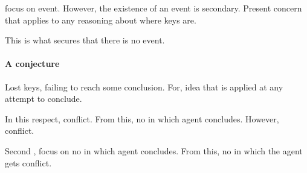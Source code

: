\begin{note}
   focus on event.
  However, the existence of an event is secondary.
  Present concern that applies to any reasoning about where keys are.

  This is what secures that there is no event.
\end{note}

\paragraph*{A conjecture}

\begin{note}
  Lost keys, failing to reach some conclusion.
  For, idea that is applied at any attempt to conclude.

  In this respect, conflict.
  From this, no \pevent{} in which agent concludes.
  However, conflict.

  Second , focus on no  in which agent concludes.
  From this, no \pevent{} in which the agent gets conflict.
\end{note}

